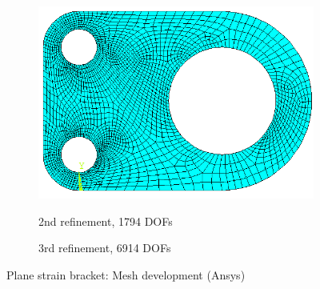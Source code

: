 \begin{figure}[h!]
\begin{subfigure}[b]{0.48\linewidth}
{            \includegraphics{adaptivity/ex_images/ex_adp_bracket_ansys_1227.png}
        }
        \caption{2nd refinement, 1794 DOFs}
    \end{subfigure}
    \begin{subfigure}[b]{0.48\linewidth}
        \centering
        \caption{3rd refinement, 6914 DOFs}
    \end{subfigure}
    \caption{Plane strain bracket: Mesh development (Ansys)}
    \label{adap_fig:ex_bracket_mesh_ansys}
\end{figure}